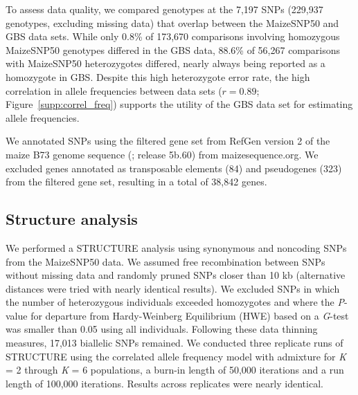 To assess data quality, we compared genotypes at the 7,197 SNPs (229,937 genotypes, excluding missing data) that overlap between the MaizeSNP50 and GBS data sets. 
While only 0.8\% of 173,670  comparisons involving homozygous MaizeSNP50 genotypes differed in the GBS data, 88.6\% of 56,267 comparisons with MaizeSNP50 heterozygotes differed, nearly always being reported as a homozygote in GBS.
Despite this high heterozygote error rate,  the high correlation in allele frequencies between data sets ($r=0.89$; Figure~\ref{supp:correl_freq}) supports the utility of the GBS data set for estimating allele frequencies.  

We annotated SNPs using the filtered gene set from RefGen version 2 of the maize B73 genome sequence (\citealt{Schnable_2009_19965430}; release 5b.60) from maizesequence.org.  
We excluded genes annotated as transposable elements (84) and pseudogenes (323) from the filtered gene set, resulting in a total of 38,842 genes.

\subsection*{Structure analysis}
We performed a {\sf STRUCTURE} analysis \cite[]{Pritchard_2000_10835412,Falush_2003_12930761} using  synonymous and noncoding SNPs from the MaizeSNP50 data. 
We assumed free recombination between SNPs without missing data and randomly pruned SNPs closer than 10 kb (alternative distances were tried with nearly identical results). 
We excluded SNPs in which the number of heterozygous individuals exceeded homozygotes and where the \emph{P}-value for departure from Hardy-Weinberg Equilibrium (HWE) based on a \emph{G}-test was smaller than 0.05 using all individuals. 
Following these data thinning measures, 17,013 biallelic SNPs remained. 
We conducted three replicate runs of {\sf STRUCTURE} using the correlated allele frequency model with admixture for \emph{K} = 2 through \emph{K} = 6 populations, a burn-in length of 50,000 iterations and a run length of 100,000 iterations. 
Results across replicates were nearly identical.

